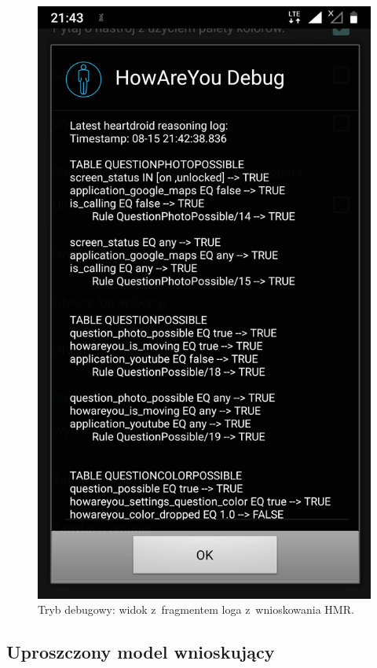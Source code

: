\begin{figure}[H]
	\centering
	\includegraphics[scale=0.15]{rozdzial4/HMR_screenshots_A.png}
	\caption{Tryb debugowy: widok z~fragmentem loga z~wnioskowania HMR.}
\end{figure}



\subsection{Uproszczony model wnioskujący}


